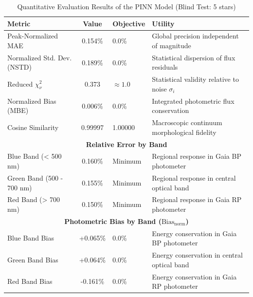 
\begin{table}[htpb]
\centering
\caption{Quantitative Evaluation Results of the PINN Model (Blind Test: 5 stars)}
\label{tab:pinn_evaluation}
\begin{tabular}{lcll}
\hline
\textbf{Metric} & \textbf{Value} & \textbf{Objective} & \textbf{Utility} \\
\hline
Peak-Normalized MAE & 0.154\% & 0.0\% & Global precision independent of magnitude \\
Normalized Std. Dev. (NSTD) & 0.189\% & 0.0\% & Statistical dispersion of flux residuals \\
Reduced $\chi^2_\nu$ & 0.373 & $\approx 1.0$ & Statistical validity relative to noise $\sigma_i$ \\
Normalized Bias (MBE) & 0.006\% & 0.0\% & Integrated photometric flux conservation \\
Cosine Similarity & 0.99997 & 1.00000 & Macroscopic continuum morphological fidelity \\
\hline
\multicolumn{4}{c}{\textbf{Relative Error by Band}} \\
\hline
Blue Band (< 500 nm) & 0.160\% & Minimum & Regional response in Gaia BP photometer \\
Green Band (500 - 700 nm) & 0.155\% & Minimum & Regional response in central optical band \\
Red Band (> 700 nm) & 0.150\% & Minimum & Regional response in Gaia RP photometer \\
\hline
\multicolumn{4}{c}{\textbf{Photometric Bias by Band ($\text{Bias}_{\text{norm}}$)}} \\
\hline
Blue Band Bias & +0.065\% & 0.0\% & Energy conservation in Gaia BP photometer \\
Green Band Bias & +0.064\% & 0.0\% & Energy conservation in central optical band \\
Red Band Bias & -0.161\% & 0.0\% & Energy conservation in Gaia RP photometer \\
\hline
\end{tabular}
\end{table}
